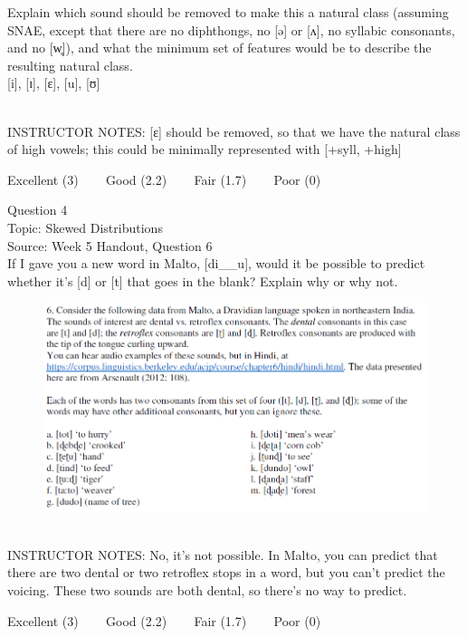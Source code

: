 \documentclass[12pt]{article}
\begin{document}
Explain which sound should be removed to make this a natural class (assuming SNAE, except that there are no diphthongs, no [ə] or [ʌ], no syllabic consonants, and no [w̥]), and what the minimum set of features would be to describe the resulting natural class.\\

{[i]}, {[ɪ]}, {[ɛ]}, {[u]}, {[ʊ]}


~\\
INSTRUCTOR NOTES: [ɛ] should be removed, so that we have the natural class of high vowels; this could be minimally represented with [+syll, +high]


\vfill
Excellent (3) ~~~ Good (2.2) ~~~ Fair (1.7) ~~~ Poor (0)
\newpage

{\large Question 4}\\

Topic: Skewed Distributions\\
Source: Week 5 Handout, Question 6\\

If I gave you a new word in Malto, [di\_\_u], would it be possible to predict whether it's [d] or [t] that goes in the blank? Explain why or why not.\\

\begin{figure}[H]
\includegraphics{../images/malto.png}
\end{figure}

~\\
INSTRUCTOR NOTES: No, it's not possible. In Malto, you can predict that there are two dental or two retroflex stops in a word, but you can't predict the voicing. These two sounds are both dental, so there's no way to predict.


\vfill
Excellent (3) ~~~ Good (2.2) ~~~ Fair (1.7) ~~~ Poor (0)
\newpage
\end{document}
